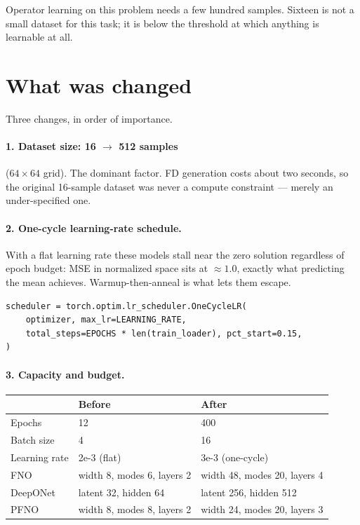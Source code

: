 \documentclass[11pt,a4paper]{article}
\begin{document}
Operator learning on this problem needs a few hundred samples. Sixteen is not a
small dataset for this task; it is below the threshold at which anything is
learnable at all.

\section{What was changed}

Three changes, in order of importance.

\paragraph{1. Dataset size: 16 $\rightarrow$ 512 samples} ($64\times64$ grid).
The dominant factor. FD generation costs about two seconds, so the original
16-sample dataset was never a compute constraint --- merely an under-specified
one.

\paragraph{2. One-cycle learning-rate schedule.} With a flat learning rate these
models stall near the zero solution regardless of epoch budget: MSE in
normalized space sits at $\approx 1.0$, exactly what predicting the mean
achieves. Warmup-then-anneal is what lets them escape.

\begin{lstlisting}
scheduler = torch.optim.lr_scheduler.OneCycleLR(
    optimizer, max_lr=LEARNING_RATE,
    total_steps=EPOCHS * len(train_loader), pct_start=0.15,
)
\end{lstlisting}

\paragraph{3. Capacity and budget.}

\begin{center}
\small
\begin{tabular}{lll}
\toprule
 & \textbf{Before} & \textbf{After}\\
\midrule
Epochs        & 12 & 400\\
Batch size    & 4  & 16\\
Learning rate & 2e-3 (flat) & 3e-3 (one-cycle)\\
FNO           & width 8, modes 6, layers 2   & width 48, modes 20, layers 4\\
DeepONet      & latent 32, hidden 64         & latent 256, hidden 512\\
PFNO          & width 8, modes 8, layers 2   & width 24, modes 20, layers 3\\
\bottomrule
\end{tabular}
\end{center}
\end{document}
